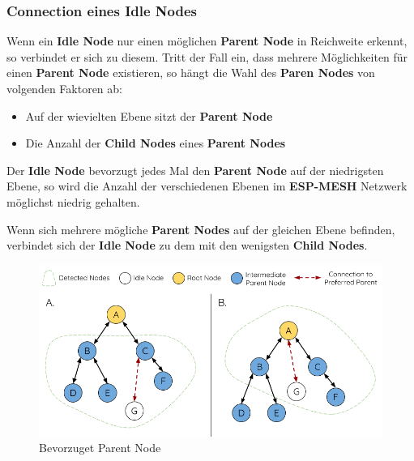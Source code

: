 \subsubsection{Connection eines Idle Nodes}
Wenn ein \textbf{Idle Node} nur einen möglichen \textbf{Parent Node} in Reichweite erkennt, so verbindet er sich zu diesem. Tritt der Fall ein, dass mehrere Möglichkeiten für einen \textbf{Parent Node} existieren, so hängt die Wahl des \textbf{Paren Nodes} von volgenden Faktoren ab:

\begin{itemize}
    \item Auf der wievielten Ebene sitzt der \textbf{Parent Node}
    \item Die Anzahl der \textbf{Child Nodes} eines \textbf{Parent Nodes}
\end{itemize}

Der \textbf{Idle Node} bevorzugt jedes Mal den \textbf{Parent Node} auf der niedrigsten Ebene, so wird die Anzahl der verschiedenen Ebenen im \textbf{ESP-MESH} Netzwerk möglichst niedrig gehalten.

Wenn sich mehrere mögliche \textbf{Parent Nodes} auf der gleichen Ebene befinden, verbindet sich der \textbf{Idle Node} zu dem mit den wenigsten \textbf{Child Nodes}.

\begin{figure}[H] \begin{center}
    \includegraphics[scale=0.5]{diagrams/mesh-preferred-parent-node.png}
    \caption{Bevorzuget Parent Node \cite{esp-mesh}}
    \end{center}    
\end{figure}
\pagebreak


